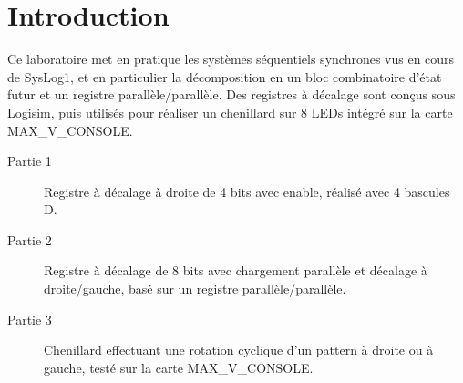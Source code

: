 \section{Introduction}

Ce laboratoire met en pratique les systèmes séquentiels synchrones vus en cours de SysLog1, et en particulier la décomposition en un bloc combinatoire d'état futur et un registre parallèle/parallèle. Des registres à décalage sont conçus sous Logisim, puis utilisés pour réaliser un chenillard sur 8 LEDs intégré sur la carte MAX\_V\_CONSOLE.

\begin{description}
	\item[Partie 1] Registre à décalage à droite de 4 bits avec enable, réalisé avec 4 bascules D.
	\item[Partie 2] Registre à décalage de 8 bits avec chargement parallèle et décalage à droite/gauche, basé sur un registre parallèle/parallèle.
	\item[Partie 3] Chenillard effectuant une rotation cyclique d'un pattern à droite ou à gauche, testé sur la carte MAX\_V\_CONSOLE.
\end{description}
